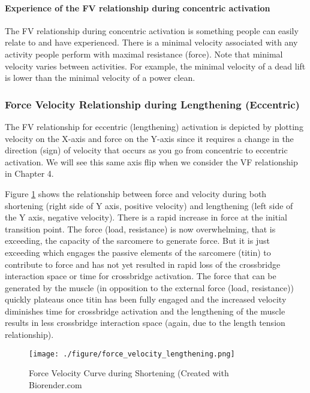 \paragraph{Experience of the FV relationship during concentric activation}
The FV relationship during concentric activation is something people can easily relate to and have experienced. There is a minimal velocity associated with any activity people perform with maximal resistance (force). Note that minimal velocity varies between activities.  For example, the minimal velocity of a dead lift is lower than the minimal velocity of a power clean. 


\subsubsection{Force Velocity Relationship during Lengthening (Eccentric)}

The FV relationship for eccentric (lengthening) activation is depicted by plotting velocity on the X-axis and force on the Y-axis since it requires a change in the direction (sign) of velocity that occurs as you go from concentric to eccentric activation. We will see this same axis flip when we consider the VF relationship in Chapter 4.

Figure \ref{fig:force_velocity_lengthening} shows the relationship between force and velocity during both shortening (right side of Y axis, positive velocity) and lengthening (left side of the Y axis, negative velocity). There is a rapid increase in force at the initial transition point. The force (load, resistance) is now overwhelming, that is exceeding, the capacity of the sarcomere to generate force. But it is just exceeding which engages the passive elements of the sarcomere (titin) to contribute to force and has not yet resulted in rapid loss of the crossbridge interaction space or time for crossbridge activation. The force that can be generated by the muscle (in opposition to the external force (load, resistance)) quickly plateaus once titin has been fully engaged and the increased velocity diminishes time for crossbridge activation and the lengthening of the muscle results in less crossbridge interaction space (again, due to the length tension relationship). 


\begin{figure}[!ht]
    \centering
    \texttt{[image: ./figure/force\_velocity\_lengthening.png]}
    \caption{Force Velocity Curve during Shortening \footnotesize{(Created with Biorender.com}}
    \label{fig:force_velocity_lengthening}
\end{figure}


